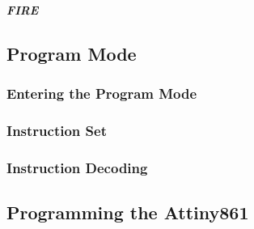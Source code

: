 \paragraph{\textit{FIRE}}
\subsection{Program Mode}
\label{Program Mode}
\subsubsection{Entering the Program Mode}
\subsubsection{Instruction Set}
\label{Instruction Set}
\subsubsection{Instruction Decoding}


\subsection{Programming the Attiny861}
\label{Programming the Attiny861}


\pagebreak


%




